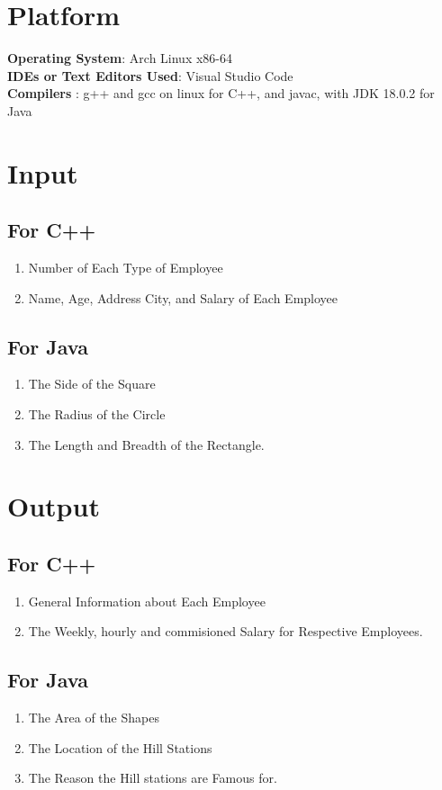 \documentclass[11pt]{article}
\begin{document}
\section{Platform}
\textbf{Operating System}: Arch Linux x86-64 \\
\textbf{IDEs or Text Editors Used}: Visual Studio Code\\
\textbf{Compilers} : g++ and gcc on linux for C++, and javac, with JDK 18.0.2 for Java\\

\section{Input}

\subsection*{For C++}
\begin{enumerate}
	\item Number of Each Type of Employee
	\item Name, Age, Address City, and Salary of Each Employee
\end{enumerate}

\subsection*{For Java}
\begin{enumerate}
	\item The Side of the Square
	\item The Radius of the Circle
	\item The Length and Breadth of the Rectangle.
\end{enumerate}

\section{Output}
\subsection*{For C++}
\begin{enumerate}
	\item General Information about Each Employee
	\item The Weekly, hourly and commisioned Salary for Respective Employees.
\end{enumerate}

\subsection*{For Java}
\begin{enumerate}
	\item The Area of the Shapes
	\item The Location of the Hill Stations
	\item The Reason the Hill stations are Famous for.
\end{enumerate}
\end{document}
